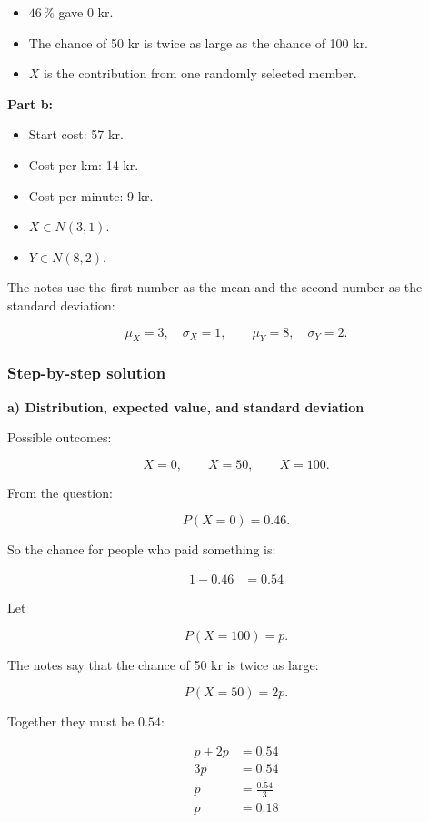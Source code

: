 \documentclass[10pt]{article}
\begin{document}
\begin{itemize}
\item $46\,\%$ gave 0 kr.
\item The chance of 50 kr is twice as large as the chance of 100 kr.
\item $X$ is the contribution from one randomly selected member.
\end{itemize}

\textbf{Part b:}

\begin{itemize}
\item Start cost: 57 kr.
\item Cost per km: 14 kr.
\item Cost per minute: 9 kr.
\item $X\in N(3,1)$.
\item $Y\in N(8,2)$.
\end{itemize}

The notes use the first number as the mean and the second number
as the standard deviation:

\[
\mu_X=3,\quad \sigma_X=1,
\qquad
\mu_Y=8,\quad \sigma_Y=2.
\]

\subsubsection*{Step-by-step solution}

\textbf{a) Distribution, expected value, and standard deviation}

Possible outcomes:

\[
X=0,\qquad X=50,\qquad X=100.
\]

From the question:

\[
P(X=0)=0.46.
\]

So the chance for people who paid something is:

\begin{align*}
1-0.46
&=0.54
\end{align*}

Let

\[
P(X=100)=p.
\]

The notes say that the chance of 50 kr is twice as large:

\[
P(X=50)=2p.
\]

Together they must be $0.54$:

\begin{align*}
p+2p
&=0.54 \\[2mm]
3p
&=0.54 \\[2mm]
p
&=\frac{0.54}{3} \\[2mm]
p
&=0.18
\end{align*}
\end{document}

